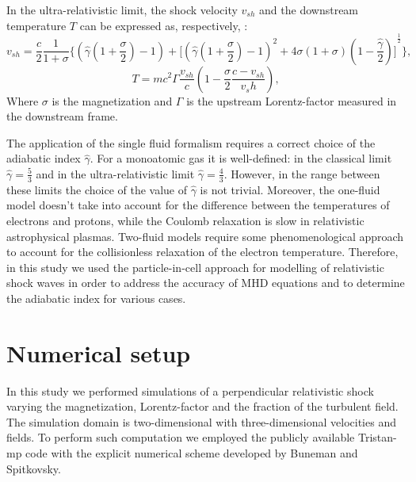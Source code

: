 \documentclass[a4paper]{jpconf}
\begin{document}
	In the ultra-relativistic limit, the shock velocity $v_{sh}$ and the downstream temperature $T$ can be expressed as, respectively, \cite{Amato2006,2011A&ARv..19...42B}:
	\begin{equation}\label{vshock}
	v_{sh} = \frac{c}{2}\frac{1}{1 + \sigma}\lbrace (\hat{\gamma}(1 + \frac{\sigma}{2})-1) + {\lbrack (\hat{\gamma}(1 + \frac{\sigma}{2})-1)^2 + 4\sigma(1+\sigma)(1 - \frac{\hat{\gamma}}{2})\rbrack}^{\frac{1}{2}} \rbrace,
	\end{equation}
	\begin{equation}\label{temperature}
	T = m c^2 \Gamma \frac{v_{sh}}{c}(1 - \frac{\sigma}{2}\frac{c - v_{sh}}{v_sh}),
	\end{equation}
	Where $\sigma$ is the magnetization and $\Gamma$ is the upstream Lorentz-factor measured in the downstream frame. 
	
	The application of the single fluid formalism requires a correct choice of the adiabatic index $\hat{\gamma}$. For a monoatomic gas it is well-defined: in the classical limit $\hat{\gamma} = \frac{5}{3}$ and in the ultra-relativistic limit $\hat{\gamma} = \frac{4}{3}$. However, in the range between these limits the choice of the value of $\hat{\gamma}$ is not trivial. Moreover, the one-fluid model doesn't take into account for the difference between the temperatures of electrons and protons, while the Coulomb relaxation is slow in relativistic astrophysical plasmas. Two-fluid models require some phenomenological approach to account for the collisionless relaxation of the electron temperature.  Therefore, in this study we used the particle-in-cell approach for modelling of relativistic shock waves in order to address the accuracy of MHD equations and to determine the adiabatic index for various cases. 
	
	
	\section{Numerical setup}
	In this study we performed simulations of a perpendicular relativistic shock  varying the magnetization, Lorentz-factor and the fraction of the turbulent field. 
	The simulation domain is two-dimensional with three-dimensional velocities and fields. To perform such computation we employed the publicly available Tristan-mp code with the explicit numerical scheme developed by Buneman \cite{Buneman93} and  Spitkovsky\cite{Spitkovsky2005}.
	
\end{document}
